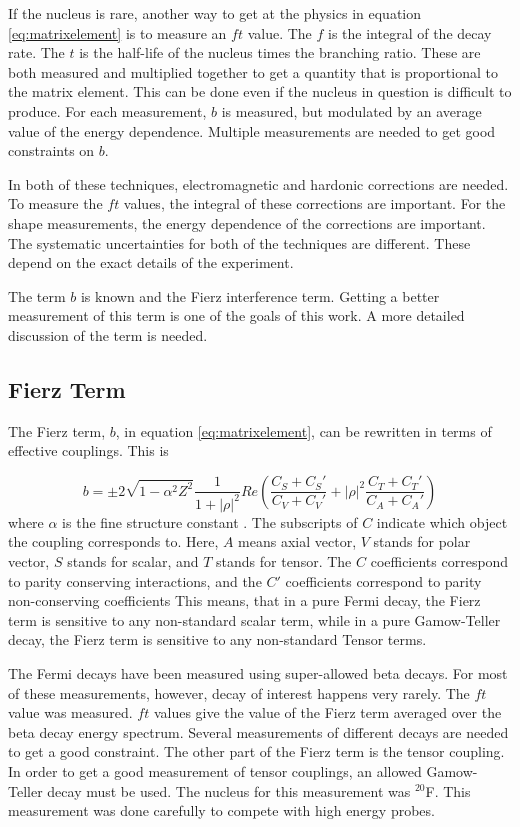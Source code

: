 \documentclass[../MaxHughesThesis.tex]{subfiles}
\begin{document}
If the nucleus is rare, another way to get at the physics in equation \ref{eq:matrixelement} is to measure an $ft$ value.
The $f$ is the integral of the decay rate.
The $t$ is the half-life of the nucleus times the branching ratio.
These are both measured and multiplied together to get a quantity that is proportional to the matrix element.
This can be done even if the nucleus in question is difficult to produce.
For each measurement, $b$ is measured, but modulated by an average value of the energy dependence.
Multiple measurements are needed to get good constraints on $b$.

In both of these techniques, electromagnetic and hardonic corrections are needed.
To measure the $ft$ values, the integral of these corrections are important.
For the shape measurements, the energy dependence of the corrections are important.
The systematic uncertainties for both of the techniques are different.
These depend on the exact details of the experiment.

The term $b$ is known and the Fierz interference term.
Getting a better measurement of this term is one of the goals of this work.
A more detailed discussion of the term is needed.

\subsection{Fierz Term}
The Fierz term, $b$, in equation \ref{eq:matrixelement}, can be rewritten in terms of effective couplings.
This is %

\begin{equation}
	b =  \pm 2 \sqrt{1 - \alpha^{2}{Z^{2}}}\frac{1}{1 + |\rho|^{2}}Re(\frac{C_{S} + C_{S}'}{C_{V} + C_{V}'} + |\rho|^{2}\frac{C_{T} + C_{T}'}{C_{A} + C_{A}'})
	\label{eq:bwrittenout}
\end{equation}
where $\alpha$ is the fine structure constant \cite{Gon19}.
The subscripts of $C$ indicate which object the coupling corresponds to. 
Here, $A$ means axial vector, $V$ stands for polar vector, $S$ stands for scalar, and $T$ stands for tensor. 
The $C$ coefficients correspond to parity conserving interactions, and the $C'$ coefficients correspond to parity non-conserving coefficients \cite{Lee56}
This means, that in a pure Fermi decay, the Fierz term is sensitive to any non-standard scalar term, while in a pure Gamow-Teller decay, the Fierz term is sensitive to any non-standard Tensor terms. 

The Fermi decays have been measured using super-allowed beta decays.
For most of these measurements, however, decay of interest happens very rarely.
The $ft$ value was measured.
$ft$ values give the value of the Fierz term averaged over the beta decay energy spectrum.
Several measurements of different decays are needed to get a good constraint.
The other part of the Fierz term is the tensor coupling. 
In order to get a good measurement of  tensor couplings, an allowed Gamow-Teller decay must be used. 
The nucleus for this measurement was $^{20}$F.
This measurement was done carefully to compete with high energy probes.
\end{document}
